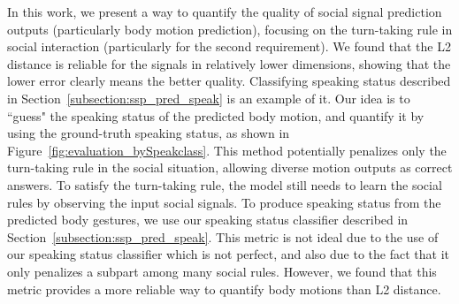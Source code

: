 In this work, we present a way to quantify the quality of social signal prediction outputs (particularly body motion prediction), focusing on the turn-taking rule in social interaction (particularly for the second requirement). We found that the L2 distance is reliable for the signals in relatively lower dimensions, showing that the lower error clearly means the better quality. Classifying speaking status described in Section~\ref{subsection:ssp_pred_speak} is an example of it.  Our idea is to ``guess" the speaking status of the predicted body motion, and quantify it by using the ground-truth speaking status, as shown in Figure~\ref{fig:evaluation_bySpeakclass}. This method potentially penalizes only the turn-taking rule in the social situation, allowing diverse motion outputs as correct answers. To satisfy the turn-taking rule, the model still needs to learn the social rules by observing the input social signals. To produce speaking status from the predicted body gestures, we use our speaking status classifier described in Section~\ref{subsection:ssp_pred_speak}. This metric is not ideal due to the use of our speaking status classifier which is not perfect, and also due to the fact that it only penalizes a subpart among many social rules. However, we found that this metric provides a more reliable way to quantify body motions than L2 distance. 











